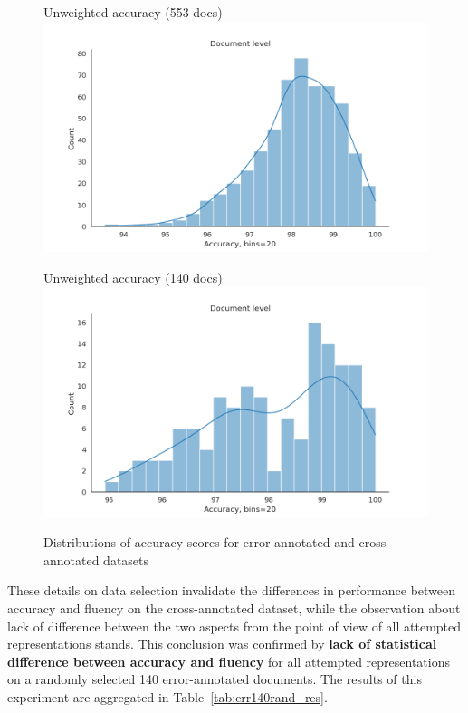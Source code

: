 \begin{figure}
	\begin{minipage}[c]{0.45\linewidth}
		\centering
		Unweighted accuracy (553 docs)
		\includegraphics[width=\linewidth]{figures/err/accuracy-distibution-noweights.png}
	\end{minipage}
	\begin{minipage}[c]{0.45\linewidth}
		\centering
		Unweighted accuracy (140 docs)
		\includegraphics[width=\linewidth]{figures/err/accuracy-distibution-140.png}
	\end{minipage}	
	\caption{\label{fig:acc140binomial}Distributions of accuracy scores for error-annotated and cross-annotated datasets}	
\end{figure}

These details on data selection invalidate the differences in performance between accuracy and fluency on the cross-annotated dataset, while the observation about lack of difference between the two aspects from the point of view of all attempted representations stands. 
This conclusion was confirmed by \textbf{lack of statistical difference between accuracy and fluency} for all attempted representations on a randomly selected 140 error-annotated documents. 
The results of this experiment are aggregated in Table~\ref{tab:err140rand_res}.

